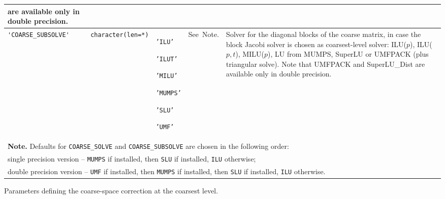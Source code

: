 \begin{center}
\begin{tabular}{|p{3.9cm}|l|p{1.7cm}|p{1.7cm}|p{8.6cm}|}
                           are available only in double precision. \\ \hline
\verb|'COARSE_SUBSOLVE'| & \verb|character(len=*)|
                         & \texttt{'ILU'} \par \texttt{'ILUT'} \par \texttt{'MILU'} \par
                            \texttt{'MUMPS'} \par \texttt{'SLU'} \par \texttt{'UMF'} 
                         & See~Note.
                         & Solver for the diagonal blocks of the coarse matrix,
                           in case the block Jacobi solver
                           is chosen as coarsest-level solver: ILU($p$), ILU($p,t$),
                           MILU($p$), LU from MUMPS, SuperLU or UMFPACK 
                          (plus triangular solve).
                          Note that UMFPACK and SuperLU\_Dist
                          are available only in double precision. \\
\hline
\multicolumn{5}{|l|}{{\bfseries Note.} Defaults for \texttt{COARSE\_SOLVE} and 
\texttt{COARSE\_SUBSOLVE} are chosen in the following  order:} \\
\multicolumn{5}{|l|}{single precision version -- \texttt{MUMPS} if installed, 
                               then \texttt{SLU} if installed, 
                               \texttt{ILU} otherwise;}\\
\multicolumn{5}{|l|}{double precision version -- \texttt{UMF} if installed, 
                               then \texttt{MUMPS} if installed, then \texttt{SLU} if  
                               installed, \texttt{ILU} otherwise.}\\
\hline
\end{tabular}
\end{center}
\caption{Parameters defining the coarse-space correction at the coarsest
level.\label{tab:p_coarse}} 
\esideways

